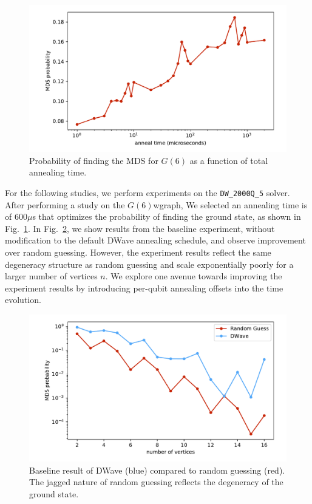\documentclass[prd,twocolumn,tightenlines,preprintnumbers,showpacs,superscriptaddress,notitlepage,nofootinbib,eqsecnum,floatfix,longbibliography]{revtex4}
\begin{document}
\begin{figure}[b]
    \centering
    \includegraphics[width=\columnwidth]{./figures/anneal_time_scaling.pdf}
    \caption{Probability of finding the MDS for $G(6)$ as a function of total annealing time.}
    \label{fig:at_scale}
\end{figure}

For the following studies, we perform experiments on the \texttt{DW\_2000Q\_5} solver.
After performing a study on the $G(6)$wgraph, We selected an annealing time is of 600$\mu$s that optimizes the probability of finding the ground state, as shown in Fig.~\ref{fig:at_scale}.
In Fig.~\ref{fig:baseline}, we show results from the baseline experiment, without modification to the default DWave annealing schedule, and observe improvement over random guessing.
However, the experiment results reflect the same degeneracy structure as random guessing and scale exponentially poorly for a larger number of vertices $n$.
We explore one avenue towards improving the experiment results by introducing per-qubit annealing offsets into the time evolution.

\begin{figure}
    \centering
    \includegraphics[width=\columnwidth]{./figures/scaling_baseline.pdf}
    \caption{Baseline result of DWave (blue) compared to random guessing (red).
The jagged nature of random guessing reflects the degeneracy of the ground state.}
    \label{fig:baseline}
\end{figure}
\end{document}
